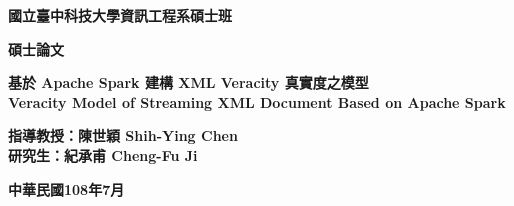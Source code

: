 \documentclass[12pt, a4paper]{article}
\begin{document}
\begin{center}
\thispagestyle{empty}
{\fontsize{22}{27} \textbf{國立臺中科技大學資訊工程系碩士班}}\\\par
\vspace{20pt}

{\fontsize{22}{27} \textbf{碩士論文}}


\vspace{3cm}

{\fontsize{24}{29} \textbf{基於 Apache Spark 建構 XML Veracity 真實度之模型}}\\
\vspace{29pt}
{\fontsize{20}{24} \textbf{Veracity Model of Streaming XML Document Based on Apache Spark}}\\
\vspace{156pt}


{\fontsize{16}{20} 
\textbf{指導教授：陳世穎 Shih-Ying Chen}\\
\vspace{20pt}
\hspace{12pt}\textbf{研究生：紀承甫 Cheng-Fu Ji}
}

\vspace{112pt}

{\fontsize{22}{27} \textbf{中華民國108年7月}}
\newpage
\thispagestyle{empty}



\end{center}
\end{document}
